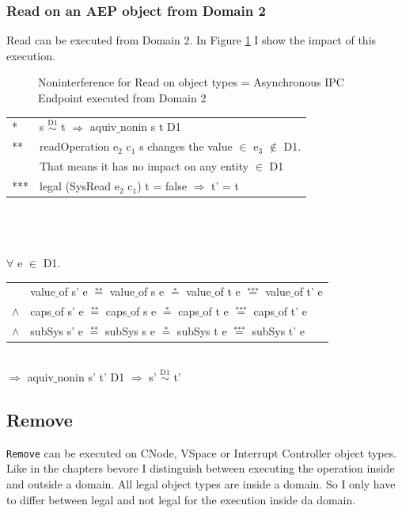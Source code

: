 \documentclass[pdftex,11pt,a4paper,twoside]{article}
\begin{document}
\subsubsection{Read on an AEP object from Domain 2}
Read can be executed from Domain 2. In Figure \ref{fig:ReadOut2} I show the impact of this execution. 
\begin{flushleft}
\begin{figure}[H]
\caption{Noninterference for Read on object types = Asynchronous IPC Endpoint executed from Domain 2}
\label{fig:ReadOut2}
\end{figure}
\end{flushleft}
\begin{tabular}{ll}
* & s $\overset{\text{D1}}{\sim}$ t $\Rightarrow$ aquiv$\_$nonin s t D1	\\ 
** & readOperation e$_2$ c$_1$ s changes the value $\in$ e$_3$ $\notin$ D1. \\
& That means it has no impact on any entity $\in$ D1 \\ 
*** & legal (SysRead e$_2$ c$_1$) t = false $\Rightarrow$ t' = t
\end{tabular} \\ \\ \\
$\forall$ e $\in$ D1. \\
\begin{tabular}{ll}
& value$\_$of s' e $\overset{\text{**}}{=}$ value$\_$of s e $\overset{\text{*}}{=}$ value$\_$of t e $\overset{\text{***}}{=}$ value$\_$of t' e \\
$\wedge$ & caps$\_$of s' e $\overset{\text{**}}{=}$ caps$\_$of s e $\overset{\text{*}}{=}$ caps$\_$of t e $\overset{\text{***}}{=}$ caps$\_$of t' e \\
$\wedge$ & subSys s' e $\overset{\text{**}}{=}$ subSys s e $\overset{\text{*}}{=}$ subSys t e $\overset{\text{***}}{=}$ subSys t' e
\end{tabular} \\
$\Rightarrow$ aquiv$\_$nonin s' t' D1 $\Rightarrow$ s' $\overset{\text{D1}}{\sim}$ t'
\subsection{Remove}\label{sec:Remove}
\texttt{Remove} can be executed on CNode, VSpace or Interrupt Controller object types. \\
Like in the chapters bevore I distinguish between executing the operation inside and outside a domain. All legal object types are inside a domain. So I only have to differ between legal and not legal for the execution inside da domain. 
\end{document}
